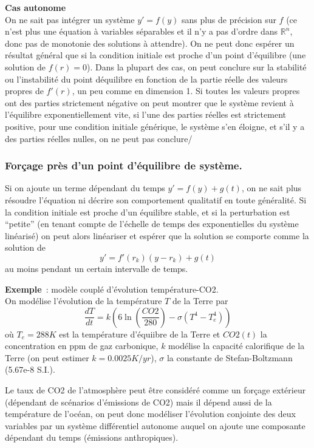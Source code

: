\documentclass[a4paper,11pt]{article}
\newcommand{\R}{{\mathbb{R}}}
\begin{document}
{\bf Cas autonome}\\
On ne sait pas int\'egrer un syst\`eme $y'=f(y)$ sans plus
de pr\'ecision sur $f$ (ce n'est plus une \'equation \`a
variables s\'eparables et il n'y a pas d'ordre dans $\R^n$,
donc pas de monotonie des solutions \`a attendre).
On ne peut donc
esp\'erer un r\'esultat g\'en\'eral que si la condition initiale 
est proche d'un point d'\'equilibre (une solution de $f(r)=0$).
Dans la plupart des cas, on peut conclure sur la stabilit\'e
ou l'instabilit\'e du point d\'equilibre en fonction de la partie
r\'eelle des valeurs propres de $f'(r)$, un peu comme en dimension 1.
Si toutes les valeurs propres ont des parties strictement n\'egative
on peut montrer que
le syst\`eme revient \`a l'\'equilibre exponentiellement vite, si
l'une des parties r\'eelles est strictement positive,
pour une condition initiale g\'en\'erique, le syst\`eme s'en
\'eloigne, et s'il y a des parties r\'eelles nulles, on ne peut pas conclure/

\subsubsection{For\c{c}age pr\`es d'un point d'\'equilibre de syst\`eme.}
Si on ajoute un terme d\'ependant du temps $y'=f(y)+g(t)$,
on ne sait plus r\'esoudre l'\'equation ni d\'ecrire
son comportement qualitatif en toute g\'en\'eralit\'e. Si
la condition initiale est proche d'un \'equilibre stable, et si
la perturbation est ``petite'' (en tenant compte de l'\'echelle
de temps des exponentielles du syst\`eme lin\'earis\'e)
on peut alors lin\'eariser et esp\'erer que
la solution se comporte comme la solution de
$$y'=f'(r_k)(y-r_k) + g(t)$$
au moins pendant un certain intervalle de temps.

{\bf Exemple}~: mod\`ele coupl\'e d'\'evolution temp\'erature-CO2.\\
On mod\'elise l'\'evolution de la temp\'erature
$T$ de la Terre par
\[ \frac{dT}{dt} = k \left( 6 \ln (\frac{CO2}{280}) - \sigma (T^4-T_e^4) \right)\]
o\`u $T_e=288K$ est la temp\'erature d'\'equiibre de la Terre et 
$CO2(t)$ la concentration en ppm de gaz carbonique, $k$ mod\'elise
la capacit\'e calorifique de la Terre (on peut estimer $k=0.0025K/yr$),
$\sigma$ la constante de Stefan-Boltzmann (5.67e-8 S.I.).

Le taux de CO2 de l'atmosph\`ere peut \^etre consid\'er\'e comme
un for\c{c}age ext\'erieur (d\'ependant de sc\'enarios d'\'emissions
de CO2) mais il d\'epend aussi de la temp\'erature de l'oc\'ean,
on peut donc mod\'eliser l'\'evolution conjointe des deux
variables par un syst\`eme diff\'erentiel autonome auquel on
ajoute une composante d\'ependant du temps (\'emissions
anthropiques).
\end{document}
